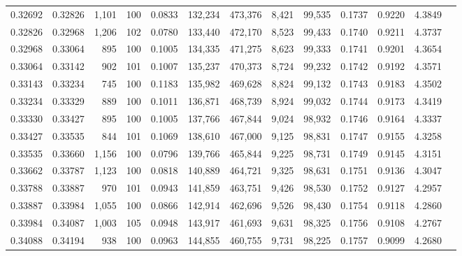 \begin{tabular}{rrrrrrrrrrrrr}
0.32692 & 0.32826 & 1,101 & 100 &                                     0.0833 & 132,234 & 473,376 &   8,421 &  99,535 & 0.1737 & 0.9220 & 4.3849 \\
0.32826 & 0.32968 & 1,206 & 102 &                                     0.0780 & 133,440 & 472,170 &   8,523 &  99,433 & 0.1740 & 0.9211 & 4.3737 \\
0.32968 & 0.33064 &   895 & 100 &                                     0.1005 & 134,335 & 471,275 &   8,623 &  99,333 & 0.1741 & 0.9201 & 4.3654 \\
0.33064 & 0.33142 &   902 & 101 &                                     0.1007 & 135,237 & 470,373 &   8,724 &  99,232 & 0.1742 & 0.9192 & 4.3571 \\
0.33143 & 0.33234 &   745 & 100 &                                     0.1183 & 135,982 & 469,628 &   8,824 &  99,132 & 0.1743 & 0.9183 & 4.3502 \\
0.33234 & 0.33329 &   889 & 100 &                                     0.1011 & 136,871 & 468,739 &   8,924 &  99,032 & 0.1744 & 0.9173 & 4.3419 \\
0.33330 & 0.33427 &   895 & 100 &                                     0.1005 & 137,766 & 467,844 &   9,024 &  98,932 & 0.1746 & 0.9164 & 4.3337 \\
0.33427 & 0.33535 &   844 & 101 &                                     0.1069 & 138,610 & 467,000 &   9,125 &  98,831 & 0.1747 & 0.9155 & 4.3258 \\
0.33535 & 0.33660 & 1,156 & 100 &                                     0.0796 & 139,766 & 465,844 &   9,225 &  98,731 & 0.1749 & 0.9145 & 4.3151 \\
0.33662 & 0.33787 & 1,123 & 100 &                                     0.0818 & 140,889 & 464,721 &   9,325 &  98,631 & 0.1751 & 0.9136 & 4.3047 \\
0.33788 & 0.33887 &   970 & 101 &                                     0.0943 & 141,859 & 463,751 &   9,426 &  98,530 & 0.1752 & 0.9127 & 4.2957 \\
0.33887 & 0.33984 & 1,055 & 100 &                                     0.0866 & 142,914 & 462,696 &   9,526 &  98,430 & 0.1754 & 0.9118 & 4.2860 \\
0.33984 & 0.34087 & 1,003 & 105 &                                     0.0948 & 143,917 & 461,693 &   9,631 &  98,325 & 0.1756 & 0.9108 & 4.2767 \\
0.34088 & 0.34194 &   938 & 100 &                                     0.0963 & 144,855 & 460,755 &   9,731 &  98,225 & 0.1757 & 0.9099 & 4.2680 \\

\end{tabular}

